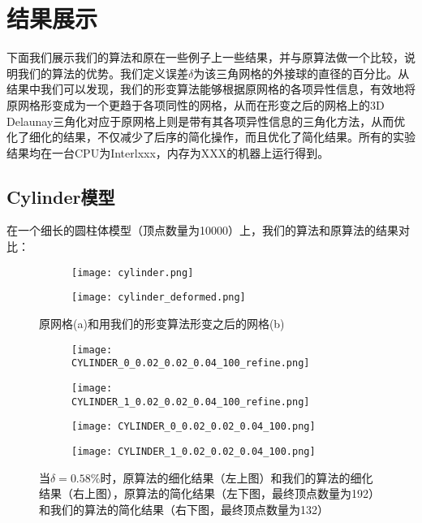 \chapter{结果展示}
下面我们展示我们的算法和原在一些例子上一些结果，并与原算法做一个比较，说明我们的算法的优势。我们定义误差$\delta$为该三角网格的外接球的直径的百分比。从结果中我们可以发现，我们的形变算法能够根据原网格的各项异性信息，有效地将原网格形变成为一个更趋于各项同性的网格，从而在形变之后的网格上的3D Delaunay三角化对应于原网格上则是带有其各项异性信息的三角化方法，从而优化了细化的结果，不仅减少了后序的简化操作，而且优化了简化结果。所有的实验结果均在一台CPU为Interlxxx，内存为XXX的机器上运行得到。

\section{Cylinder模型}
在一个细长的圆柱体模型（顶点数量为10000）上，我们的算法和原算法的结果对比：
\begin{figure}[htbp]
  \centering
  \begin{subfigure}[b]{0.4\textwidth}
    \texttt{[image: cylinder.png]}
    \end{subfigure}
    \begin{subfigure}[b]{0.4\textwidth}
      \texttt{[image: cylinder\_deformed.png]}
    \end{subfigure}
    \caption[Cylinder形变结果]{原网格(a)和用我们的形变算法形变之后的网格(b)}
    \label{fig:cylinder-deform}
\end{figure}


\begin{figure}[htbp]
  \centering
  \begin{subfigure}[b]{0.4\textwidth}
    \texttt{[image: CYLINDER\_0\_0.02\_0.02\_0.04\_100\_refine.png]}
  \end{subfigure}
  \begin{subfigure}[b]{0.4\textwidth}
    \texttt{[image: CYLINDER\_1\_0.02\_0.02\_0.04\_100\_refine.png]}
  \end{subfigure}
  \begin{subfigure}[b]{0.4\textwidth}
    \texttt{[image: CYLINDER\_0\_0.02\_0.02\_0.04\_100.png]}
  \end{subfigure}
  \begin{subfigure}[b]{0.4\textwidth}
    \texttt{[image: CYLINDER\_1\_0.02\_0.02\_0.04\_100.png]}
  \end{subfigure}
  \caption[当$\delta=0.58\%$时Cylinder结果对比]{当$\delta=0.58\%$时，原算法的细化结果（左上图）和我们的算法的细化结果（右上图），原算法的简化结果（左下图，最终顶点数量为192）和我们的算法的简化结果（右下图，最终顶点数量为132）}
  \label{fig:cylinder-res1}
\end{figure}


